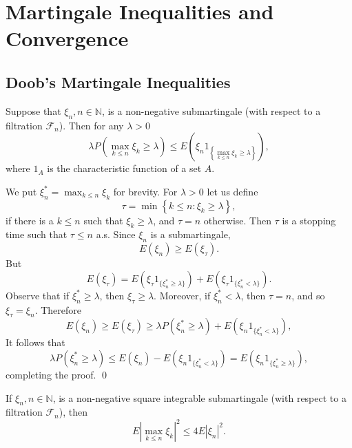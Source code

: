 
\chapter{Martingale Inequalities and Convergence}
\label{chap:MartingaleInequalitiesConvergence}

\section{Doob's Martingale Inequalities}
\label{sec:DoobsMartingaleInequalities}

\begin{Proposition}
\label{prop:DoobsMaximalInequality}
Suppose that $\xi_{n}, n \in \mathbb{N}$, is a non-negative submartingale (with respect to a filtration $\mathcal{F}_{n}$). Then for any $\lambda > 0$
\[
\lambda P \left(\max_{k \leq n} \xi_{k} \geq \lambda\right) \leq E \left(\xi_{n} 1_{\left\{\max_{k \leq n} \xi_{k} \geq \lambda \right\}}\right),
\]
where $1_A$ is the characteristic function of a set $A$.
\end{Proposition}

\begin{Proof}
We put $\xi_{n}^{*} = \max_{k\leq n}\xi_{k}$ for brevity. For $\lambda >0$ let us define
\[
\tau = \min \left\{k \leq n: \xi_{k} \geq \lambda \right\},
\]
if there is a $k \leq n$ such that $\xi_k \geq \lambda$, and $\tau = n$ otherwise. Then $\tau$ is a stopping time such that $\tau \leq n$ a.s. Since $\xi_n$ is a submartingale,
\[
E (\xi_{n}) \geq E (\xi_{\tau}).
\]
But
\[
E (\xi_{\tau}) = E \left(\xi_{\tau} 1_{\{\xi_{n}^{*} \geq \lambda \}}\right) + E \left(\xi_{\tau} 1_{\{\xi_{n}^{*} < \lambda \}}\right).
\]
Observe that if $\xi_n^* \geq \lambda$, then $\xi_\tau \geq \lambda$. Moreover, if $\xi_n^* < \lambda$, then $\tau = n$, and so $\xi_\tau = \xi_n$. Therefore
\[
E (\xi_{n}) \geq E (\xi_{\tau}) \geq \lambda P (\xi_{n}^{*} \geq \lambda) + E (\xi_{n} 1_{\{\xi_{n}^{*} < \lambda \}}),
\]
It follows that
\[
\lambda P \left(\xi_{n}^{*} \geq \lambda\right) \leq E \left(\xi_{n}\right) - E \left(\xi_{n} 1_{\{\xi_{n}^{*} < \lambda \}}\right) = E \left(\xi_{n} 1_{\{\xi_{n}^{*} \geq \lambda \}}\right),
\]
completing the proof. \qed
\end{Proof}

\begin{Theorem}
\label{th:DoobsMaximalL2Inequality}
If $\xi_{n}, n \in \mathbb{N}$, is a non-negative square integrable submartingale (with respect to a filtration $\mathcal{F}_{n}$), then
\[
E \left| \max_{k \leq n} \xi_{k} \right|^{2} \leq 4 E | \xi_{n} |^{2}. \tag{4.2}
\]
\end{Theorem}


